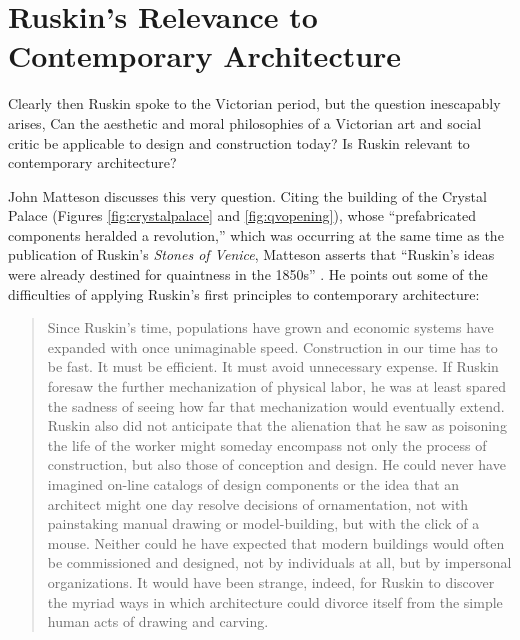 \section[Ruskin's Relevance]{Ruskin's Relevance to Contemporary Architecture}


Clearly then Ruskin spoke to the Victorian period, but the question
inescapably arises, Can the aesthetic and moral philosophies of a
Victorian art and social critic be applicable to design and
construction today?  Is Ruskin relevant to contemporary architecture? 


John Matteson discusses this very question.  Citing the building of the
Crystal Palace (Figures \ref{fig:crystalpalace} and \ref{fig:qvopening}), 
whose ``prefabricated components heralded a
revolution,'' which was occurring at the same time as the publication of
Ruskin's \textit{Stones of Venice}, Matteson asserts
that ``Ruskin’s ideas were already destined for quaintness in the
1850s'' \citep[][p.~300]{matteson2002}.  He points out some of the difficulties of
applying Ruskin's first principles to contemporary
architecture: 


\begin{quote}
Since Ruskin’s time, populations have grown and economic systems have
expanded with once unimaginable speed.  Construction in our time has to
be fast.  It must be efficient.  It must avoid unnecessary expense.  If
Ruskin foresaw the further mechanization of physical labor, he was at
least spared the sadness of seeing how far that mechanization would
eventually extend.  Ruskin also did not anticipate that the alienation
that he saw as poisoning the life of the worker might someday encompass
not only the process of construction, but also those of conception and
design.  He could never have imagined on-line catalogs of design
components or the idea that an architect might one day resolve
decisions of ornamentation, not with painstaking manual drawing or
model-building, but with the click of a mouse.  Neither could he have
expected that modern buildings would often be commissioned and
designed, not by individuals at all, but by impersonal organizations. 
It would have been strange, indeed, for Ruskin to discover the myriad
ways in which architecture could divorce itself from the simple human
acts of drawing and carving. \citep[][p.~300]{matteson2002}
\end{quote}

